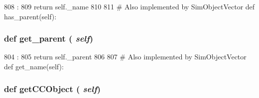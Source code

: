 \begin{DoxyCode}
808                       :
809         return self._name
810 
811     # Also implemented by SimObjectVector
    def has_parent(self):
\end{DoxyCode}
\hypertarget{classm5_1_1SimObject_1_1SimObject_a19ef6174bcc02d0e3400041dc20ae1f6}{
\subsubsection[{get\_\-parent}]{\setlength{\rightskip}{0pt plus 5cm}def get\_\-parent ( {\em self})}}
\label{classm5_1_1SimObject_1_1SimObject_a19ef6174bcc02d0e3400041dc20ae1f6}



\begin{DoxyCode}
804                         :
805         return self._parent
806 
807     # Also implemented by SimObjectVector
    def get_name(self):
\end{DoxyCode}
\hypertarget{classm5_1_1SimObject_1_1SimObject_ad7cf8ae27e29af27929fec8ddf3459e7}{
\subsubsection[{getCCObject}]{\setlength{\rightskip}{0pt plus 5cm}def getCCObject ( {\em self})}}
\label{classm5_1_1SimObject_1_1SimObject_ad7cf8ae27e29af27929fec8ddf3459e7}



